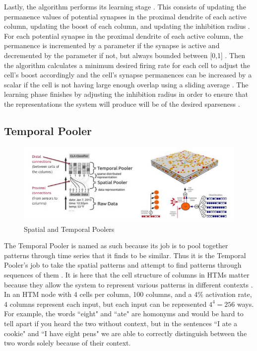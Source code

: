 \documentclass[fleqn,notitlepage,minimal]{article}
\begin{document}
	Lastly, the algorithm performs its learning stage \cite{Whitepaper}. This consists of updating the permanence values of potential synapses in the proximal dendrite of each active column, updating the boost of each column, and updating the inhibition radius \cite{Whitepaper}. For each potential synapse in the proximal dendrite of each active column, the permanence is incremented by a parameter if the synapse is active and decremented by the parameter if not, but always bounded between [0,1] \cite{Whitepaper}. Then the algorithm calculates a minimum desired firing rate for each cell to adjust the cell's boost accordingly and the cell's synapse permanences can be increased by a scalar if the cell is not having large enough overlap using a sliding average \cite{Whitepaper}. The learning phase finishes by adjusting the inhibition radius in order to ensure that the representations the system will produce will be of the desired sparseness \cite{Whitepaper}.
	
	
	\subsection{Temporal Pooler}
	
	\begin{figure}[h!]
		\centering
		\includegraphics[width=\linewidth]{images/Poolers.jpg}
		\caption{Spatial and Temporal Poolers}
		\label{fig 2}
	\end{figure}
	
	The Temporal Pooler is named as such because its job is to pool together patterns through time series that it finds to be similar. Thus it is the Temporal Pooler's job to take the spatial patterns and attempt to find patterns through sequences of them \cite{Principles}. It is here that the cell structure of columns in HTMs matter because they allow the system to represent various patterns in different contexts \cite{Principles}. In an HTM node with 4 cells per column, 100 columns, and a 4\% activation rate, 4 columns represent each input, but each input can be represented $4^{4}=256$ ways. For example, the words ``eight" and ``ate" are homonyms and would be hard to tell apart if you heard the two without context, but in the sentences ``I ate a cookie" and ``I have eight pens" we are able to correctly distinguish between the two words solely because of their context.
	
\end{document}
